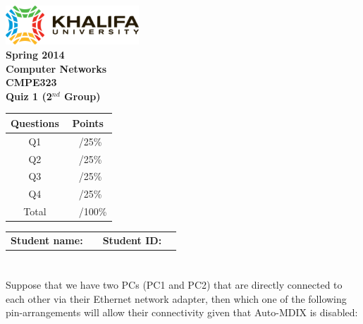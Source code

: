 \documentclass[pdftex,12pt,a4paper]{article}
\begin{document}
    \begin{titlepage}
        \begin{center}
            \includegraphics[width=5cm]{figures/kulogo}\\[1cm]
            {\large \bfseries
                Spring 2014\\
                Computer Networks\\
                CMPE323\\[1cm]
            }
            {\large \bfseries
                \noindent Quiz 1 (2$^{nd}$ Group)\\[1cm]
            }
        \end{center}

        \begin{center}
            \begin{tabular}{|c|p{1cm}l|}\hline
                \textbf{Questions} & \multicolumn{2}{|c|}{\textbf{Points}} \\\hline
                Q1                &    &    /25\%   \\
                Q2                &    &    /25\%   \\
                Q3                &    &    /25\%   \\
                Q4                &    &    /25\%   \\\hline
                Total             &    &    /100\%  \\\hline
            \end{tabular}
        \end{center}

        \vfill
        \begin{tabular}{lp{5cm}ll}
            \textbf{Student name:} & & \textbf{Student ID:} & \\
        \end{tabular}


    \end{titlepage}
    \newpage

    \section{}
        Suppose that we have two PCs (PC1 and PC2) that are directly connected to each
        other via their Ethernet network adapter, then which one of the
        following pin-arrangements will allow their connectivity given that
        Auto-MDIX is disabled:
\end{document}
